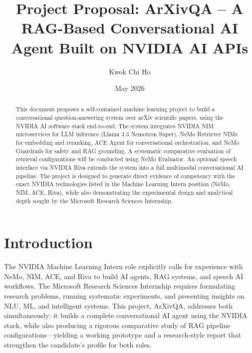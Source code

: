 \documentclass[a4paper,11pt]{article}
\title{\textbf{Project Proposal: ArXivQA -- A RAG-Based Conversational AI Agent Built on NVIDIA AI APIs}}
\author{Kwok Chi Ho}
\date{May 2026}
\begin{document}
\maketitle

\begin{abstract}
This document proposes a self-contained machine learning project to build a conversational question-answering system over arXiv scientific papers, using the NVIDIA AI software stack end-to-end. The system integrates NVIDIA NIM microservices for LLM inference (Llama 3.3 Nemotron Super), NeMo Retriever NIMs for embedding and reranking, ACE Agent for conversational orchestration, and NeMo Guardrails for safety and RAG grounding. A systematic comparative evaluation of retrieval configurations will be conducted using NeMo Evaluator. An optional speech interface via NVIDIA Riva extends the system into a full multimodal conversational AI pipeline. The project is designed to generate direct evidence of competency with the exact NVIDIA technologies listed in the Machine Learning Intern position (NeMo, NIM, ACE, Riva), while also demonstrating the experimental design and analytical depth sought by the Microsoft Research Sciences Internship.
\end{abstract}

\section{Introduction}
The NVIDIA Machine Learning Intern role explicitly calls for experience with NeMo, NIM, ACE, and Riva to build AI agents, RAG systems, and speech AI workflows. The Microsoft Research Sciences Internship requires formulating research problems, running systematic experiments, and presenting insights on NLU, ML, and intelligent systems. This project, ArXivQA, addresses both simultaneously: it builds a complete conversational AI agent using the NVIDIA stack, while also producing a rigorous comparative study of RAG pipeline configurations—yielding a working prototype and a research-style report that strengthen the candidate's profile for both roles.
\end{document}
